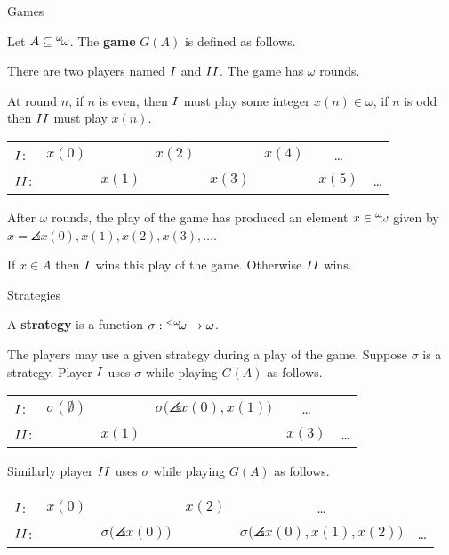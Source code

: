 \documentclass[pdf,final]{prosper}
\newcommand{\skipsmall}{\vspace{1em}}
\begin{document}
\begin{slide}{Games}
\begin{definition}
Let $A\subseteq{}^{\omega}\!{\omega}$. The \textbf{game} $G(A)$ is defined as
follows.

\skipsmall

There are two players named $I$ and $II$. The game has $\omega$
rounds. 

\skipsmall

At round $n$, if $n$ is even, then $I$ must play some integer
$x(n)\in\omega$, if $n$ is odd then $II$ must play $x(n)$. 

\skipsmall

\begin{tabular}{lccccccr}
$I$: & $x(0)$ & & $x(2)$ & & $x(4)$ & \dots &\\
$II$: & & $x(1)$ & &$x(3)$ & &$x(5)$ & \dots
\end{tabular}

\skipsmall

After $\omega$ rounds, the
play of the game has produced an element $x\in{}^{\omega}\!{\omega}$ given by
$x=\angles{x(0),x(1),x(2),x(3),\dots}$. 

\skipsmall

If $x\in A$ then $I$ wins this play
of the game. Otherwise $II$ wins.
\end{definition}


\end{slide}

\begin{slide}{Strategies}

\begin{definition}
A \textbf{strategy} is a function $\sigma:{}^{<\omega}\!{\omega}\rightarrow\omega$. 
\end{definition}

\skipsmall

The players may use a given strategy during a play of the game. Suppose $\sigma$
is a strategy. Player $I$ uses $\sigma$ while playing $G(A)$ as follows.

\skipsmall

\begin{tabular}{lccccr}
$I$: & $\sigma(\emptyset)$ & & $\sigma\bigl(\angles{x(0),x(1)}\bigr)$ &   \dots &\\
$II$: & & $x(1)$ & &$x(3)$  & \dots
\end{tabular}

\skipsmall

Similarly player $II$ uses $\sigma$ while
playing $G(A)$ as follows.

\skipsmall

\begin{tabular}{lccccr}
$I$: & $x(0)$ & & $x(2)$ &   \dots &\\
$II$: & & $\sigma\bigl(\angles{x(0)}\bigr)$ & &$\sigma\bigl(\angles{x(0),x(1),x(2)}\bigr)$  & \dots
\end{tabular}

\end{slide}
\end{document}
